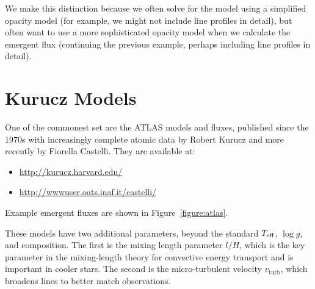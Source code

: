 We make this distinction because we often solve for the model using a simplified opacity model (for example, we might not include line profiles in detail), but often want to use a more sophisticated opacity model when we calculate the emergent flux (continuing the previous example, perhaps including line profiles in detail).

\newslide

\section{Kurucz Models}

One of the commonest set are the ATLAS models and fluxes, published since the 1970s with increasingly complete atomic data by Robert Kurucz and more recently by Fiorella Castelli. They are available at:

\begin{itemize}
\item \url{http://kurucz.harvard.edu/}
\item \url{http://wwwuser.oats.inaf.it/castelli/}
\end{itemize}

Example emergent fluxes are shown in Figure~\ref{figure:atlas}.

These models have two additional parameters, beyond the standard $T_\mathrm{eff}$, $\log g$, and composition. The first is the mixing length parameter $l/H$, which is the key parameter in the mixing-length theory for convective energy transport and is important in cooler stars. The second is the micro-turbulent velocity $v_\mathrm{turb}$, which broadens lines to better match observations.

